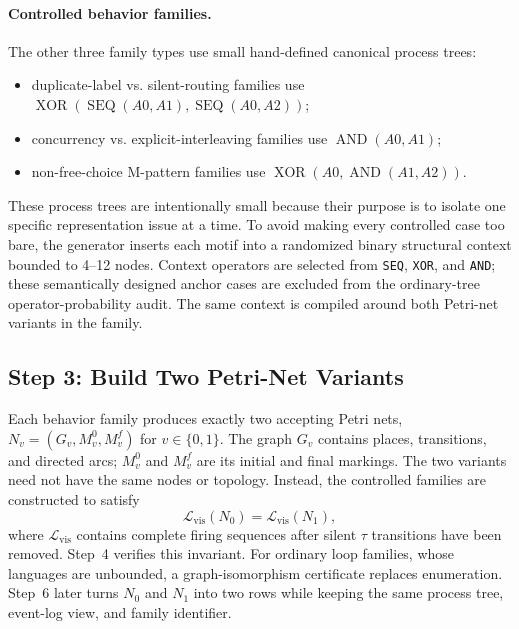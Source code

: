 \documentclass[manuscript,screen,nonacm]{acmart}
\begin{document}
\paragraph{Controlled behavior families.}
The other three family types use small hand-defined canonical process trees:
\begin{itemize}
  \item duplicate-label vs. silent-routing families use
        $\operatorname{XOR}(\operatorname{SEQ}(A0,A1),
        \operatorname{SEQ}(A0,A2))$;
  \item concurrency vs. explicit-interleaving families use
        $\operatorname{AND}(A0,A1)$;
  \item non-free-choice M-pattern families use
        $\operatorname{XOR}(A0,\operatorname{AND}(A1,A2))$.
\end{itemize}
These process trees are intentionally small because their purpose is to isolate one
specific representation issue at a time. To avoid making every controlled case
too bare, the generator inserts each motif into a randomized binary structural
context bounded to 4--12 nodes. Context operators are selected from
\texttt{SEQ}, \texttt{XOR}, and \texttt{AND}; these semantically designed anchor
cases are excluded from the ordinary-tree operator-probability audit. The same
context is compiled around both Petri-net variants in the family.

\subsection{Step 3: Build Two Petri-Net Variants}
\label{app:build-petri-variants}

Each behavior family produces exactly two accepting Petri nets,
$N_v=(G_v,M^0_v,M^f_v)$ for $v\in\{0,1\}$. The graph $G_v$ contains places,
transitions, and directed arcs; $M^0_v$ and $M^f_v$ are its initial and final
markings. The two variants need not have the same nodes or topology. Instead,
the controlled families are constructed to satisfy
\begin{equation}
  \mathcal{L}_{\mathrm{vis}}(N_0)=\mathcal{L}_{\mathrm{vis}}(N_1),
  \label{eq:app-visible-language-invariant}
\end{equation}
where $\mathcal{L}_{\mathrm{vis}}$ contains complete firing sequences after
silent $\tau$ transitions have been removed. Step~4 verifies this invariant.
For ordinary loop families, whose languages are unbounded, a graph-isomorphism
certificate replaces enumeration. Step~6 later turns $N_0$ and $N_1$ into two
rows while keeping the same process tree, event-log view, and family identifier.
\end{document}
